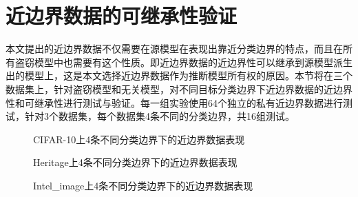 \section{近边界数据的可继承性验证}\label{5.4}

本文提出的近边界数据不仅需要在源模型在表现出靠近分类边界的特点，而且在所有盗窃模型中也需要有这个性质。即近边界数据的近边界性可以继承到源模型派生出的模型上，这是本文选择近边界数据作为推断模型所有权的原因。本节将在三个数据集上，针对盗窃模型和无关模型，对不同目标分类边界下近边界数据的近边界性和可继承性进行测试与验证。每一组实验使用64个独立的私有近边界数据进行测试，针对3个数据集，每个数据集4条不同的分类边界，共16组测试。

\begin{figure}[!htb]
	\centering
	\caption{CIFAR-10上4条不同分类边界下的近边界数据表现}
	\label{CIFAR-10上不同分类边界下的近边界数据表现}
\end{figure}

\begin{figure}[!htb]
	\centering
	\caption{Heritage上4条不同分类边界下的近边界数据表现}
	\label{Heritage上不同分类边界下的近边界数据表现}
\end{figure}

\begin{figure}[!htb]
	\centering
	\caption{Intel\_image上4条不同分类边界下的近边界数据表现}
	\label{Intel-image上不同分类边界下的近边界数据表现}
\end{figure}

